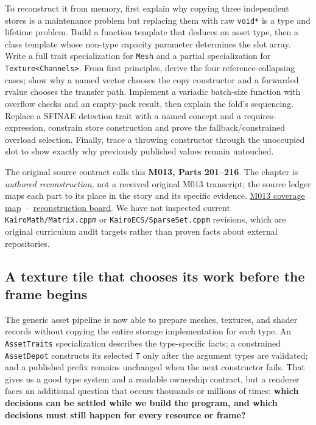 To reconstruct it from memory, first explain why copying three independent stores is a maintenance problem but replacing them with raw \texttt{void*} is a type and lifetime problem. Build a function template that deduces an asset type, then a class template whose non-type capacity parameter determines the slot array. Write a full trait specialization for \texttt{Mesh} and a partial specialization for \texttt{Texture\textless{}Channels\textgreater{}}. From first principles, derive the four reference-collapsing cases; show why a named vector chooses the copy constructor and a forwarded rvalue chooses the transfer path. Implement a variadic batch-size function with overflow checks and an empty-pack result, then explain the fold's sequencing. Replace a SFINAE detection trait with a named concept and a requires-expression, constrain store construction and prove the fallback/constrained overload selection. Finally, trace a throwing constructor through the unoccupied slot to show exactly why previously published values remain untouched.

The original source contract calls this \textbf{M013, Parts 201--216}. The chapter is \emph{authored reconstruction}, not a received original M013 transcript; the source ledger maps each part to its place in the story and its specific evidence. \hyperref[appendix-fd090d982a15]{M013 coverage map} · \hyperref[appendix-960160274237]{reconstruction board}. We have not inspected current \texttt{KairoMath/Matrix.cppm} or \texttt{KairoECS/SparseSet.cppm} revisions, which are original curriculum audit targets rather than proven facts about external repositories.

\subsection{A texture tile that chooses its work before the frame begins}\label{a-texture-tile-that-chooses-its-work-before-the-frame-begins}

The generic asset pipeline is now able to prepare meshes, textures, and shader records without copying the entire storage implementation for each type. An \texttt{AssetTraits} specialization describes the type-specific facts; a constrained \texttt{AssetDepot} constructs its selected \texttt{T} only after the argument types are validated; and a published prefix remains unchanged when the next constructor fails. That gives us a good type system and a readable ownership contract, but a renderer faces an additional question that occurs thousands or millions of times: \textbf{which decisions can be settled while we build the program, and which decisions must still happen for every resource or frame?}

